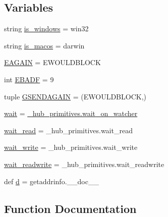 \subsection*{Variables}
\begin{DoxyCompactItemize}
\item 
string \hyperlink{namespacegevent_1_1__socketcommon_a739532b032ab532cbb360dd0d30a1229}{is\+\_\+windows} = \textquotesingle{}win32\textquotesingle{}
\item 
string \hyperlink{namespacegevent_1_1__socketcommon_a96117f85d3a16cc13e3359932cc75bed}{is\+\_\+macos} = \textquotesingle{}darwin\textquotesingle{}
\item 
\hyperlink{namespacegevent_1_1__socketcommon_a641e38024afabb842e9d5fa8e28f03fc}{E\+A\+G\+A\+IN} = E\+W\+O\+U\+L\+D\+B\+L\+O\+CK
\item 
int \hyperlink{namespacegevent_1_1__socketcommon_ad9e6b2543a0f63d03b9414e0cc671e67}{E\+B\+A\+DF} = 9
\item 
tuple \hyperlink{namespacegevent_1_1__socketcommon_a65633bdfc515a3e0dcdd1d57efd3e6d9}{G\+S\+E\+N\+D\+A\+G\+A\+IN} = (E\+W\+O\+U\+L\+D\+B\+L\+O\+CK,)
\item 
\hyperlink{namespacegevent_1_1__socketcommon_afab16c412595601b1fcaab485b8e826c}{wait} = \hyperlink{namespacegevent_1_1__hub__primitives_ae484b73e4c293e8788d5857165c2e230}{\+\_\+hub\+\_\+primitives.\+wait\+\_\+on\+\_\+watcher}
\item 
\hyperlink{namespacegevent_1_1__socketcommon_ace429b82f733b0a970f3748aed0a9cde}{wait\+\_\+read} = \+\_\+hub\+\_\+primitives.\+wait\+\_\+read
\item 
\hyperlink{namespacegevent_1_1__socketcommon_a8cfd99a64597c3b76fc45edc9ba6711e}{wait\+\_\+write} = \+\_\+hub\+\_\+primitives.\+wait\+\_\+write
\item 
\hyperlink{namespacegevent_1_1__socketcommon_ae5cd9e8f537c5048349e0475775a2ce5}{wait\+\_\+readwrite} = \+\_\+hub\+\_\+primitives.\+wait\+\_\+readwrite
\item 
def \hyperlink{namespacegevent_1_1__socketcommon_abadc1a71ac7e1c3552c362f380b398cd}{d} = getaddrinfo.\+\_\+\+\_\+doc\+\_\+\+\_\+
\end{DoxyCompactItemize}


\subsection{Function Documentation}
\mbox{\label{namespacegevent_1_1__socketcommon_a93106cd28e74e4e80dfd3f9d74661ee9}} 
